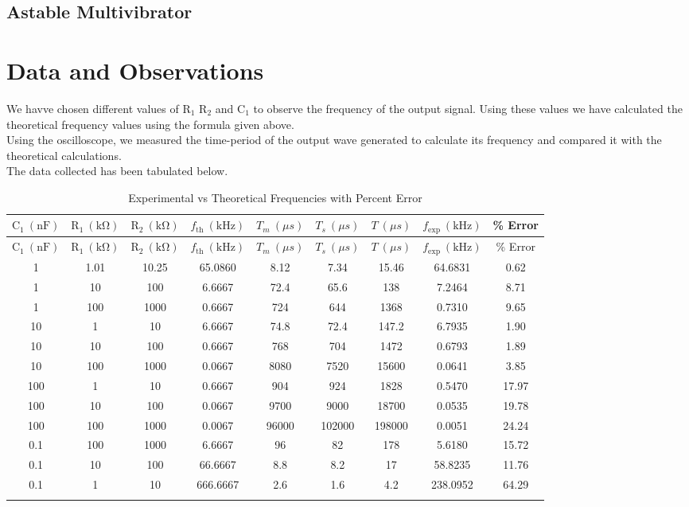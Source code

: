 \documentclass[12pt]{article}
\begin{document}
\subsection{Astable Multivibrator}
 
\section{Data and Observations}
We havve chosen different values of $\mathrm{R_1}$ $\mathrm{R_2}$ and $\mathrm{C_1}$ to observe the frequency of the output signal. Using these values we have calculated the theoretical frequency values using the formula given above.\\
Using the oscilloscope, we measured the time-period of the output wave generated to calculate its frequency and compared it with the theoretical calculations. \\
The data collected has been tabulated below.
\begin{longtable}{|c|c|c|c||c|c|c|c||c|}
    \hline
    $\mathrm{C_1\ (nF)}$ & $\mathrm{R_1\ (k\Omega)}$ & $\mathrm{R_2\ (k\Omega)}$ & $f_\mathrm{th}\ (\mathrm{kHz})$ & $T_m\ (\mu s)$ & $T_s\ (\mu s)$ & $T\ (\mu s)$ & $f_\mathrm{exp}\ (\mathrm{kHz})$ & \% Error \\
    \hline
    \endfirsthead
    
    \hline
    $\mathrm{C_1\ (nF)}$ & $\mathrm{R_1\ (k\Omega)}$ & $\mathrm{R_2\ (k\Omega)}$ & $f_\mathrm{th}\ (\mathrm{kHz})$ & $T_m\ (\mu s)$ & $T_s\ (\mu s)$ & $T\ (\mu s)$ & $f_\mathrm{exp}\ (\mathrm{kHz})$ & \% Error \\
    \hline
    \endhead
    
    \hline
    \endfoot
    
    \endlastfoot
    
    1 & 1.01 & 10.25 & 65.0860 & 8.12 & 7.34 & 15.46 & 64.6831 & 0.62 \\ \hline
    1 & 10 & 100 & 6.6667 & 72.4 & 65.6 & 138 & 7.2464 & 8.71 \\ \hline
    1 & 100 & 1000 & 0.6667 & 724 & 644 & 1368 & 0.7310 & 9.65 \\ \hline
    10 & 1 & 10 & 6.6667 & 74.8 & 72.4 & 147.2 & 6.7935 & 1.90 \\ \hline
    10 & 10 & 100 & 0.6667 & 768 & 704 & 1472 & 0.6793 & 1.89 \\ \hline
    10 & 100 & 1000 & 0.0667 & 8080 & 7520 & 15600 & 0.0641 & 3.85 \\ \hline
    100 & 1 & 10 & 0.6667 & 904 & 924 & 1828 & 0.5470 & 17.97 \\ \hline
    100 & 10 & 100 & 0.0667 & 9700 & 9000 & 18700 & 0.0535 & 19.78 \\ \hline
    100 & 100 & 1000 & 0.0067 & 96000 & 102000 & 198000 & 0.0051 & 24.24 \\ \hline
    0.1 & 100 & 1000 & 6.6667 & 96 & 82 & 178 & 5.6180 & 15.72 \\ \hline
    0.1 & 10 & 100 & 66.6667 & 8.8 & 8.2 & 17 & 58.8235 & 11.76 \\ \hline
    0.1 & 1 & 10 & 666.6667 & 2.6 & 1.6 & 4.2 & 238.0952 & 64.29 \\ \hline
    
    \caption{Experimental vs Theoretical Frequencies with Percent Error}
\end{longtable}
\end{document}
